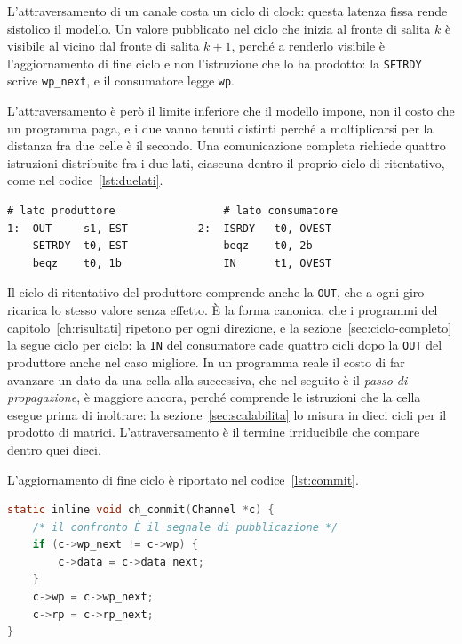 L'attraversamento di un canale costa un ciclo di clock: questa latenza fissa rende
sistolico il modello. Un valore pubblicato nel ciclo che inizia al fronte di
salita $k$ è visibile al vicino dal fronte di salita $k+1$, perché a renderlo visibile è l'aggiornamento di fine ciclo e non
l'istruzione che lo ha prodotto: la \texttt{SETRDY} scrive \texttt{wp\_next}, e
il consumatore legge \texttt{wp}.

L'attraversamento è però il limite inferiore che il modello impone, non il
costo che un programma paga, e i due vanno tenuti distinti perché a
moltiplicarsi per la distanza fra due celle è il secondo. Una comunicazione
completa richiede quattro istruzioni distribuite fra i due lati, ciascuna dentro
il proprio ciclo di ritentativo, come nel codice~\ref{lst:duelati}.

\begin{lstlisting}[caption={Le quattro istruzioni di una comunicazione nel programma della cella},label={lst:duelati},language=RISCV,float=htbp]
# lato produttore                 # lato consumatore
1:  OUT     s1, EST           2:  ISRDY   t0, OVEST
    SETRDY  t0, EST               beqz    t0, 2b
    beqz    t0, 1b                IN      t1, OVEST
\end{lstlisting}

Il ciclo di ritentativo del produttore comprende anche la \texttt{OUT}, che a
ogni giro ricarica lo stesso valore senza effetto. È la forma canonica, che i
programmi del capitolo~\ref{ch:risultati} ripetono per ogni direzione, e la
sezione~\ref{sec:ciclo-completo} la segue ciclo per ciclo: la
\texttt{IN} del consumatore cade quattro cicli dopo la \texttt{OUT} del
produttore anche nel caso migliore. In un programma reale il costo di far avanzare un dato da una
cella alla successiva, che nel seguito è il \emph{passo di propagazione}, è
maggiore ancora, perché comprende le istruzioni che la cella esegue prima di
inoltrare: la sezione~\ref{sec:scalabilita} lo misura in dieci cicli per il
prodotto di matrici. L'attraversamento è il termine irriducibile che compare
dentro quei dieci.

L'aggiornamento di fine ciclo è riportato nel codice~\ref{lst:commit}.

\begin{lstlisting}[caption={L'aggiornamento con cui il simulatore chiude ogni ciclo di clock},label={lst:commit},language=C,float=htbp]
static inline void ch_commit(Channel *c) {
    /* il confronto È il segnale di pubblicazione */
    if (c->wp_next != c->wp) {
        c->data = c->data_next;
    }
    c->wp = c->wp_next;
    c->rp = c->rp_next;
}
\end{lstlisting}

